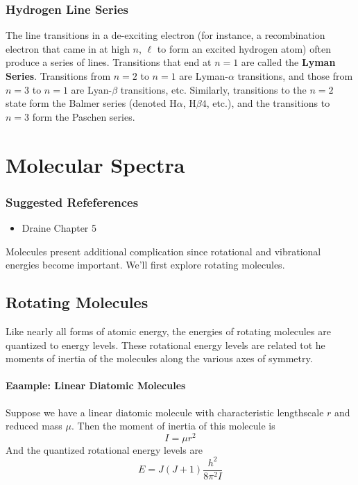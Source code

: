 \documentclass[10pt]{article}
\numberwithin{equation}{section}
\begin{document}
\subsubsection{Hydrogen Line Series} %
\label{ssub:hydrogen_line_series}
The line transitions in a de-exciting electron (for instance, a recombination
electron that came in at high $n$, $\ell$ to form an excited hydrogen atom)
often produce a series of lines. Transitions that end at $n=1$ are called the
\textbf{Lyman Series}. Transitions from $n=2$ to $n=1$ are Lyman-$\alpha$
transitions, and those from $n=3$ to $n=1$ are Lyan-$\beta$ transitions, etc.
Similarly, transitions to the $n=2$ state form the Balmer series (denoted
H$\alpha$, H$\beta4$, etc.), and the transitions to $n=3$ form the Paschen
series.
\section{Molecular Spectra} %
\label{sec:molecular_spectra}
\subsubsection*{Suggested Refeferences} %
\label{ssub:suggested_refeferences}
\begin{itemize}
  \item Draine Chapter 5
\end{itemize}
Molecules present additional complication since rotational and vibrational
energies become important. We'll first explore rotating molecules.
\subsection{Rotating Molecules} %
\label{sub:rotating_molecules}
Like nearly all forms of atomic energy, the energies of rotating molecules are
quantized to energy levels. These rotational energy levels are related tot he
moments of inertia of the molecules along the various axes of symmetry.

\paragraph{Eaample: Linear Diatomic Molecules} %
\label{par:eaample_linear_diatomic_molecules}
Suppose we have a linear diatomic molecule with characteristic lengthscale $r$
and reduced mass $\mu$. Then the moment of inertia of this molecule is
\begin{equation}
  \label{eq:ldmol:1} I = \mu r^2
\end{equation}
And the quantized rotational energy levels are
\begin{equation}
  \label{eq:ldmol:2} E = J(J+1)\frac{h^2}{8\pi^2 I}
\end{equation}
\end{document}
